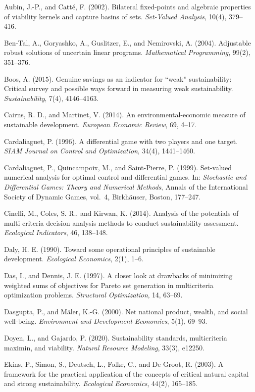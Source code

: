 \documentclass[review,11pt]{elsarticle}
\begin{document}
Aubin, J.-P., and Catt\'e, F. (2002). Bilateral fixed-points and algebraic properties of viability kernels and capture basins of sets. \emph{Set-Valued Analysis}, 10(4), 379--416.

Ben-Tal, A., Goryashko, A., Guslitzer, E., and Nemirovski, A. (2004).
Adjustable robust solutions of uncertain linear programs.
\emph{Mathematical Programming}, 99(2), 351--376.

Boos, A. (2015). Genuine savings as an indicator for ``weak''
sustainability: Critical survey and possible ways forward in measuring
weak sustainability. \emph{Sustainability}, 7(4), 4146--4163.

Cairns, R. D., and Martinet, V. (2014). An environmental-economic
measure of sustainable development. \emph{European Economic Review}, 69,
4--17.

Cardaliaguet, P. (1996). A differential game with two players and one target. \emph{SIAM Journal on Control and Optimization}, 34(4), 1441--1460.

Cardaliaguet, P., Quincampoix, M., and Saint-Pierre, P. (1999). Set-valued numerical analysis for optimal control and differential games. In: \emph{Stochastic and Differential Games: Theory and Numerical Methods}, Annals of the International Society of Dynamic Games, vol.~4, Birkh\"auser, Boston, 177--247.

Cinelli, M., Coles, S. R., and Kirwan, K. (2014). Analysis of the
potentials of multi criteria decision analysis methods to conduct
sustainability assessment. \emph{Ecological Indicators}, 46, 138--148.

Daly, H. E. (1990). Toward some operational principles of sustainable
development. \emph{Ecological Economics}, 2(1), 1--6.

Das, I., and Dennis, J. E. (1997). A closer look at drawbacks of
minimizing weighted sums of objectives for Pareto set generation in
multicriteria optimization problems. \emph{Structural Optimization}, 14,
63--69.

Dasgupta, P., and M\"aler, K.-G. (2000). Net national product, wealth, and
social well-being. \emph{Environment and Development Economics}, 5(1),
69--93.

Doyen, L., and Gajardo, P. (2020). Sustainability standards,
multicriteria maximin, and viability. \emph{Natural Resource Modeling},
33(3), e12250.

Ekins, P., Simon, S., Deutsch, L., Folke, C., and De Groot, R. (2003). A
framework for the practical application of the concepts of critical
natural capital and strong sustainability. \emph{Ecological Economics},
44(2), 165--185.
\end{document}
